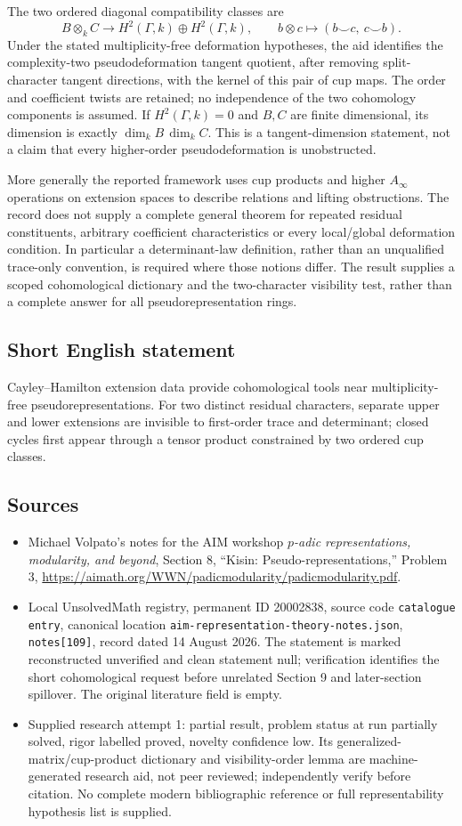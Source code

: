 \documentclass[11pt]{article}
\begin{document}
The two ordered diagonal compatibility classes are
\[
 B\otimes_k C\longrightarrow H^2(\Gamma,k)\oplus H^2(\Gamma,k),
 \qquad b\otimes c\longmapsto(b\smile c,\ c\smile b).
\]
Under the stated multiplicity-free deformation hypotheses, the aid identifies the complexity-two pseudodeformation tangent quotient, after removing split-character tangent directions, with the kernel of this pair of cup maps. The order and coefficient twists are retained; no independence of the two cohomology components is assumed. If $H^2(\Gamma,k)=0$ and $B,C$ are finite dimensional, its dimension is exactly $\dim_kB\,\dim_kC$. This is a tangent-dimension statement, not a claim that every higher-order pseudodeformation is unobstructed.

More generally the reported framework uses cup products and higher $A_\infty$ operations on extension spaces to describe relations and lifting obstructions. The record does not supply a complete general theorem for repeated residual constituents, arbitrary coefficient characteristics or every local/global deformation condition. In particular a determinant-law definition, rather than an unqualified trace-only convention, is required where those notions differ. The result supplies a scoped cohomological dictionary and the two-character visibility test, rather than a complete answer for all pseudorepresentation rings.
\subsection{Short English statement}
Cayley--Hamilton extension data provide cohomological tools near multiplicity-free pseudorepresentations. For two distinct residual characters, separate upper and lower extensions are invisible to first-order trace and determinant; closed cycles first appear through a tensor product constrained by two ordered cup classes.
\subsection{Sources}
\begin{itemize}
\item Michael Volpato's notes for the AIM workshop \emph{$p$-adic representations, modularity, and beyond}, Section 8, ``Kisin: Pseudo-representations,'' Problem 3, \url{https://aimath.org/WWN/padicmodularity/padicmodularity.pdf}.
\item Local UnsolvedMath registry, permanent ID 20002838, source code \texttt{catalogue entry}, canonical location \texttt{aim-representation-theory-notes.json}, \texttt{notes[109]}, record dated 14 August 2026. The statement is marked reconstructed unverified and clean statement null; verification identifies the short cohomological request before unrelated Section 9 and later-section spillover. The original literature field is empty.
\item Supplied research attempt 1: partial result, problem status at run partially solved, rigor labelled proved, novelty confidence low. Its generalized-matrix/cup-product dictionary and visibility-order lemma are machine-generated research aid, not peer reviewed; independently verify before citation. No complete modern bibliographic reference or full representability hypothesis list is supplied.
\end{itemize}
\end{document}
